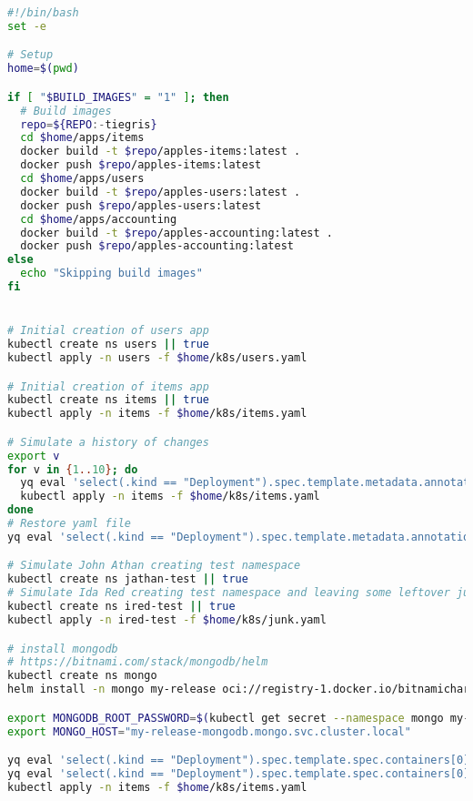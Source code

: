 \begin{lstlisting}[caption={initial-setup.sh},language=bash,label=appendix:csr:setup]
#!/bin/bash
set -e

# Setup
home=$(pwd)

if [ "$BUILD_IMAGES" = "1" ]; then
  # Build images
  repo=${REPO:-tiegris}
  cd $home/apps/items
  docker build -t $repo/apples-items:latest .
  docker push $repo/apples-items:latest
  cd $home/apps/users
  docker build -t $repo/apples-users:latest .
  docker push $repo/apples-users:latest
  cd $home/apps/accounting
  docker build -t $repo/apples-accounting:latest .
  docker push $repo/apples-accounting:latest
else
  echo "Skipping build images"
fi


# Initial creation of users app
kubectl create ns users || true
kubectl apply -n users -f $home/k8s/users.yaml

# Initial creation of items app
kubectl create ns items || true
kubectl apply -n items -f $home/k8s/items.yaml

# Simulate a history of changes
export v
for v in {1..10}; do
  yq eval 'select(.kind == "Deployment").spec.template.metadata.annotations.v = env(v)' $home/k8s/items.yaml -i
  kubectl apply -n items -f $home/k8s/items.yaml
done
# Restore yaml file
yq eval 'select(.kind == "Deployment").spec.template.metadata.annotations.v = "0"' $home/k8s/items.yaml -i

# Simulate John Athan creating test namespace
kubectl create ns jathan-test || true
# Simulate Ida Red creating test namespace and leaving some leftover junk in it
kubectl create ns ired-test || true
kubectl apply -n ired-test -f $home/k8s/junk.yaml

# install mongodb
# https://bitnami.com/stack/mongodb/helm
kubectl create ns mongo
helm install -n mongo my-release oci://registry-1.docker.io/bitnamicharts/mongodb

export MONGODB_ROOT_PASSWORD=$(kubectl get secret --namespace mongo my-release-mongodb -o jsonpath="{.data.mongodb-root-password}" | base64 -d)
export MONGO_HOST="my-release-mongodb.mongo.svc.cluster.local"

yq eval 'select(.kind == "Deployment").spec.template.spec.containers[0].env[0].value = env(MONGODB_ROOT_PASSWORD)' $home/k8s/items.yaml -i
yq eval 'select(.kind == "Deployment").spec.template.spec.containers[0].env[1].value = env(MONGO_HOST)' $home/k8s/items.yaml -i
kubectl apply -n items -f $home/k8s/items.yaml
\end{lstlisting}

